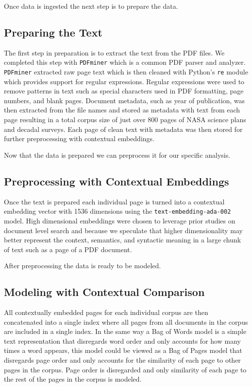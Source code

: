 \documentclass[preprint,12pt]{elsarticle}
\begin{document}
Once data is ingested the next step is to prepare the data.

\subsection{Preparing the Text}
The first step in preparation is to extract the text from the PDF files. We completed this step with \texttt{PDFminer} which is a common PDF parser and analyzer\cite{pdfminer}. \texttt{PDFminer} extracted raw page text which is then cleaned with Python's \texttt{re} module which provides support for regular expressions. Regular expressions were used to remove patterns in text such as special characters used in PDF formatting, page numbers, and blank pages. Document metadata, such as year of publication, was then extracted from the file names and stored as metadata with text from each page resulting in a total corpus size of just over 800 pages of NASA science plans and decadal surveys. Each page of clean text with metadata was then stored for further preprocessing with contextual embeddings. 

Now that the data is prepared we can preprocess it for our specific analysis.

\subsection{Preprocessing with Contextual Embeddings}

Once the text is prepared each individual page is turned into a contextual embedding vector with 1536 dimensions using the \texttt{text-embedding-ada-002} model. High dimensional embeddings were chosen to leverage prior studies on document level search \cite{Aperdannier2024_embedding_search} and because we speculate that higher dimensionality may better represent the context, semantics, and syntactic meaning in a large chunk of text such as a page of a PDF document. 

After preprocessing the data is ready to be modeled. 

\subsection{Modeling with Contextual Comparison}
All contextually embedded pages for each individual corpus are then concatenated into a single index where all pages from all documents in the corpus are included in a single index. In the same way a Bag of Words model is a simple text representation that disregards word order and only accounts for how many times a word appears, this model could be viewed as a Bag of Pages model that disregards page order and only accounts for the similarity of each page to other pages in the corpus. Page order is disregarded and only similarity of each page to the rest of the pages in the corpus is modeled. 
\end{document}
